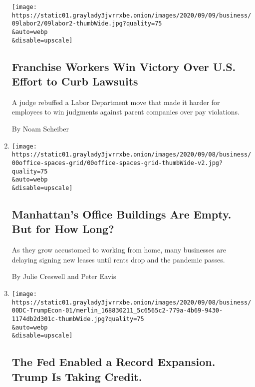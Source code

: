 \begin{enumerate}
  \texttt{[image: https://static01.graylady3jvrrxbe.onion/images/2020/09/09/business/09labor2/09labor2-thumbWide.jpg?quality=75\\\&auto=webp\\\&disable=upscale]}

  \hypertarget{franchise-workers-win-victory-over-us-effort-to-curb-lawsuits}{%
  \subsection{Franchise Workers Win Victory Over U.S. Effort to Curb
  Lawsuits}\label{franchise-workers-win-victory-over-us-effort-to-curb-lawsuits}}

  A judge rebuffed a Labor Department move that made it harder for
  employees to win judgments against parent companies over pay
  violations.

  By Noam Scheiber
\item
  \href{/2020/09/08/business/economy/new-york-office-space-coronavirus.html}{}

  \texttt{[image: https://static01.graylady3jvrrxbe.onion/images/2020/09/08/business/00office-spaces-grid/00office-spaces-grid-thumbWide-v2.jpg?quality=75\\\&auto=webp\\\&disable=upscale]}

  \hypertarget{manhattans-office-buildings-are-empty-but-for-how-long}{%
  \subsection{Manhattan's Office Buildings Are Empty. But for How
  Long?}\label{manhattans-office-buildings-are-empty-but-for-how-long}}

  As they grow accustomed to working from home, many businesses are
  delaying signing new leases until rents drop and the pandemic passes.

  By Julie Creswell and Peter Eavis
\item
  \href{/2020/09/08/business/economy/trump-economy-fed.html}{}

  \texttt{[image: https://static01.graylady3jvrrxbe.onion/images/2020/09/08/business/00DC-TrumpEcon-01/merlin\_168830211\_5c6565c2-779a-4b69-9430-1174db2d301c-thumbWide.jpg?quality=75\\\&auto=webp\\\&disable=upscale]}

  \hypertarget{the-fed-enabled-a-record-expansion-trump-is-taking-credit}{%
  \subsection{The Fed Enabled a Record Expansion. Trump Is Taking
  Credit.}\label{the-fed-enabled-a-record-expansion-trump-is-taking-credit}}


\end{enumerate}
